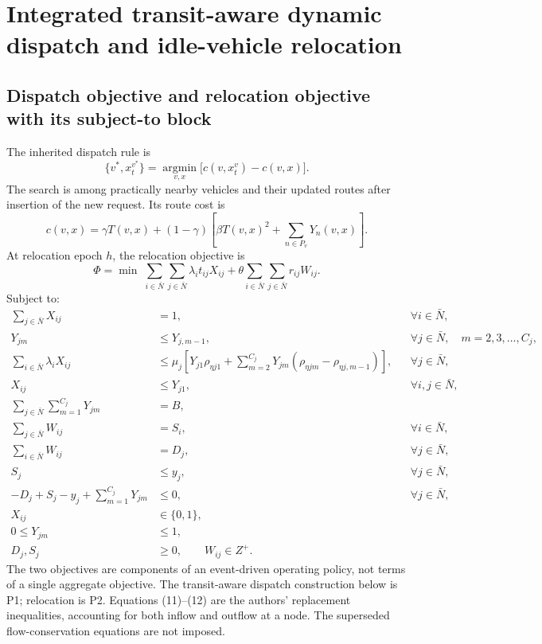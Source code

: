\documentclass{article}
\begin{document}
\section*{Integrated transit-aware dynamic dispatch and idle-vehicle relocation}

\subsection*{Dispatch objective and relocation objective with its subject-to block}
The inherited dispatch rule is
\begin{equation}
\{v^*,x_t^{v^*}\}=\operatorname*{argmin}_{v,x}
\bigl[c(v,x_t^v)-c(v,x)\bigr].\tag{1}
\end{equation}
The search is among practically nearby vehicles and their updated routes after insertion of the new request. Its route cost is
\begin{equation}
c(v,x)=\gamma T(v,x)+(1-\gamma)
\left[\beta T(v,x)^2+\sum_{n\in P_v}Y_n(v,x)\right].\tag{2}
\end{equation}
At relocation epoch $h$, the relocation objective is
\begin{equation}
\Phi=\min\;\sum_{i\in\bar N}\sum_{j\in\bar N}\lambda_i t_{ij}X_{ij}
+\theta\sum_{i\in\bar N}\sum_{j\in\bar N}r_{ij}W_{ij}.\tag{3}
\end{equation}
Subject to:
\begin{align}
\sum_{j\in\bar N}X_{ij}&=1,
&&\forall i\in\bar N,\tag{4}\\
Y_{jm}&\leq Y_{j,m-1},
&&\forall j\in\bar N,\quad m=2,3,\ldots,C_j,\tag{5}\\
\sum_{i\in\bar N}\lambda_iX_{ij}
&\leq\mu_j\left[Y_{j1}\rho_{\eta j1}
+\sum_{m=2}^{C_j}Y_{jm}(\rho_{\eta jm}-\rho_{\eta j,m-1})\right],
&&\forall j\in\bar N,\tag{6}\\
X_{ij}&\leq Y_{j1},&&\forall i,j\in\bar N,\tag{7}\\
\sum_{j\in\bar N}\sum_{m=1}^{C_j}Y_{jm}&=B,\tag{8}\\
\sum_{j\in\bar N}W_{ij}&=S_i,&&\forall i\in\bar N,\tag{9}\\
\sum_{i\in\bar N}W_{ij}&=D_j,&&\forall j\in\bar N,\tag{10}\\
S_j&\leq y_j,&&\forall j\in\bar N,\tag{11}\\
-D_j+S_j-y_j+\sum_{m=1}^{C_j}Y_{jm}&\leq0,
&&\forall j\in\bar N,\tag{12}\\
X_{ij}&\in\{0,1\},\tag{13}\\
0\leq Y_{jm}&\leq1,\tag{14}\\
D_j,S_j&\geq0,\qquad W_{ij}\in Z^+.\tag{15}
\end{align}
The two objectives are components of an event-driven operating policy, not terms of a single aggregate objective. The transit-aware dispatch construction below is P1; relocation is P2. Equations (11)--(12) are the authors' replacement inequalities, accounting for both inflow and outflow at a node. The superseded flow-conservation equations are not imposed.
\end{document}
